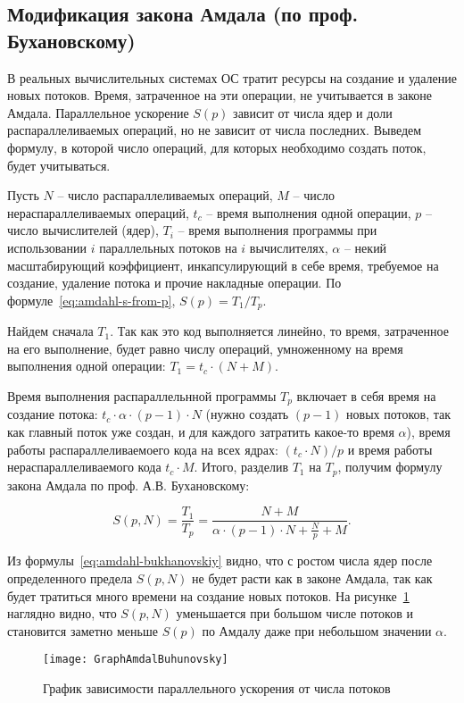 \subsection{Модификация закона Амдала (по проф. Бухановскому)}
\label{subsec:amdahl-law-bukhanovskiy-modification}


В реальных вычислительных системах ОС тратит ресурсы на создание и удаление новых потоков. Время, затраченное на эти операции, не учитывается в законе Амдала. Параллельное ускорение $S(p)$ зависит от числа ядер и доли распараллеливаемых операций, но не зависит от числа последних. Выведем формулу, в которой число операций, для которых необходимо создать поток, будет учитываться.

Пусть $N$ -- число распараллеливаемых операций, $M$ -- число нераспараллеливаемых операций, $t_c$ -- время выполнения одной операции, $p$ -- число вычислителей (ядер), $T_i$ -- время выполнения программы при использовании $i$ параллельных потоков на $i$ вычислителях, $\alpha$ -- некий масштабирующий коэффициент, инкапсулирующий в себе время, требуемое на создание, удаление потока и прочие накладные операции. 
По формуле~\eqref{eq:amdahl-s-from-p}, $S(p) = {T_1} / {T_p}$.

Найдем сначала $T_1$. Так как это код выполняется линейно, то время, затраченное на его выполнение, будет равно числу операций, умноженному на время выполнения одной операции: $T_1 = t_c \cdot (N + M)$.

Время выполнения распараллельнной программы $T_p$ включает в себя время на создание потока: $t_c \cdot \alpha \cdot (p - 1) \cdot N$ (нужно создать $(p - 1)$ новых потоков, так как главный поток уже создан, и для каждого затратить какое-то время $\alpha$), время работы распараллеливаемоего кода на всех ядрах: $(t_c \cdot N) / {p}$ и время работы нераспараллеливаемого кода $t_c \cdot M$. Итого, разделив $T_1$ на $T_p$, получим формулу закона Амдала по проф. А.В. Бухановскому:

\begin{equation}
    \label{eq:amdahl-bukhanovskiy}
    S(p,N) = \frac{T_1}{T_p} = \frac{N + M}{\alpha \cdot (p - 1) \cdot N + \displaystyle\frac{N}{p} + M}.
\end{equation}

Из формулы~\eqref{eq:amdahl-bukhanovskiy} видно, что с ростом числа ядер после определенного предела $S(p,N)$  не будет расти как в законе Амдала, так как будет тратиться много времени на создание новых потоков. На рисунке~\ref{fig:amdahl-bukhanovskiy} наглядно видно, что $S(p,N)$ уменьшается при большом числе потоков и становится заметно меньше $S(p)$ по Амдалу даже при небольшом значении $\alpha$.

\begin{figure}[H]
    \texttt{[image: GraphAmdalBuhunovsky]} %
    \caption{График зависимости параллельного ускорения от числа потоков}
    \label{fig:amdahl-bukhanovskiy}
\end{figure}
